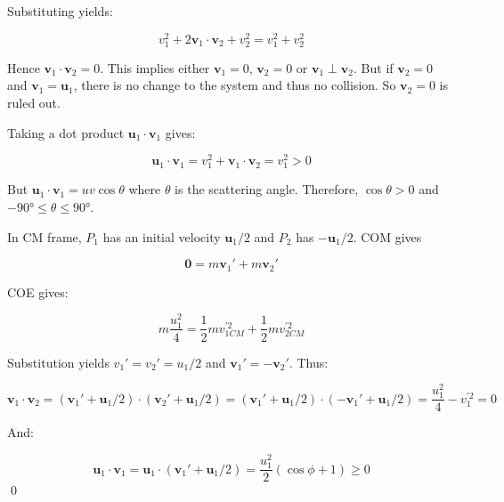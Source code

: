 \documentclass[12pt]{article}
\begin{document}
Substituting yields:

\begin{equation}
    v_{1}^{2} + 2 \mathbf{v}_{1} \cdot \mathbf{v}_{2} + v_{2}^{2} = v_{1}^{2} + v_{2}^{2}
\end{equation}

Hence $\mathbf{v}_{1} \cdot \mathbf{v}_{2} = 0$. This implies either $\mathbf{v}_{1} = 0$, $\mathbf{v}_{2} = 0$ or $\mathbf{v}_{1} \perp \mathbf{v}_{2}$. But if $\mathbf{v}_{2} = 0$ and $\mathbf{v}_{1} = \mathbf{u}_{1}$, there is no change to the system and thus no collision. So $\mathbf{v}_{2} = 0$ is ruled out.

Taking a dot product $\mathbf{u}_{1} \cdot \mathbf{v}_{1}$ gives:

\begin{equation}
    \mathbf{u}_{1} \cdot \mathbf{v}_{1} = v_{1}^{2} + \mathbf{v}_{1} \cdot \mathbf{v}_{2} = v_{1}^{2} > 0
\end{equation}

But $\mathbf{u}_{1} \cdot \mathbf{v}_{1} = uv \cos{\theta}$ where $\theta$ is the scattering angle. Therefore, $\cos{\theta} > 0$ and $\ang{-90} \le \theta \le \ang{90}$.

In CM frame, $P_{1}$ has an initial velocity $\mathbf{u}_{1}/2$ and $P_{2}$ has $-\mathbf{u}_{1}/2$. COM gives

\begin{equation}
    \mathbf{0} = m \mathbf{v}_{1}' + m \mathbf{v}_{2}'
\end{equation}

COE gives:

\begin{equation}
    m \frac{u_{1}^{2}}{4} = \frac{1}{2} m v_{1CM}^{'2} + \frac{1}{2} m v_{2CM}^{'2}
\end{equation}

Substitution yields $v_{1}' = v_{2}' = u_{1}/2$ and $\mathbf{v}_{1}' = -\mathbf{v}_{2}'$. Thus:

\begin{equation}
    \mathbf{v}_{1} \cdot \mathbf{v}_{2} = (\mathbf{v}_{1}' + \mathbf{u}_{1}/2) \cdot (\mathbf{v}_{2}' + \mathbf{u}_{1}/2) = (\mathbf{v}_{1}' + \mathbf{u}_{1}/2) \cdot (-\mathbf{v}_{1}' + \mathbf{u}_{1}/2) = \frac{u_{1}^{2}}{4} - v_{1}^{'2} = 0
\end{equation}

And:

\begin{equation}
    \mathbf{u}_{1} \cdot \mathbf{v}_{1} = \mathbf{u}_{1} \cdot (\mathbf{v}_{1}' + \mathbf{u}_{1}/2) = \frac{u_{1}^{2}}{2} \left( \cos{\phi} + 1 \right) \ge 0
\end{equation}
\qed
\end{document}

